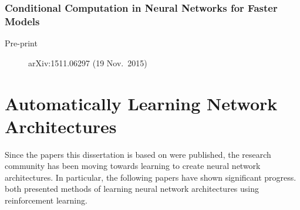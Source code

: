 \documentclass[thesis]{subfiles}
\begin{document}
\subsubsection*{Conditional Computation in Neural Networks for Faster Models}
\begin{description}
    \item[Pre-print] arXiv:1511.06297 (19 Nov.\ 2015)
\end{description}
\citet{BengioE2015}

\section[Automatically Learning Network Architectures]{Automatically Learning Network\texorpdfstring{\\}{ }Architectures}
Since the papers this dissertation is based on were published, the research community has been moving towards learning to create neural network architectures. In particular, the following papers have shown significant progress.
\citet{baker2017, zoph2017} both presented methods of learning neural network architectures using reinforcement learning. 
\end{document}
